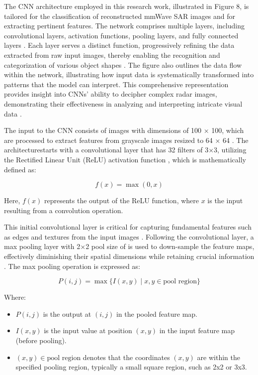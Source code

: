 \documentclass[journal,article,submit,pdftex,moreauthors]{Definitions/mdpi}
\begin{document}
The CNN architecture employed in this research work, illustrated in Figure 8, is tailored for the classification of reconstructed mmWave SAR images and for extracting pertinent features. The network comprises multiple layers, including convolutional layers, activation functions, pooling layers, and fully connected layers \cite{simonyan2014very}. Each layer serves a distinct function, progressively refining the data extracted from raw input images, thereby enabling the recognition and categorization of various object shapes \cite{zeiler2014visualizing}. The figure also outlines the data flow within the network, illustrating how input data is systematically transformed into patterns that the model can interpret. This comprehensive representation provides insight into CNNs' ability to decipher complex radar images, demonstrating their effectiveness in analyzing and interpreting intricate visual data \cite{goodfellow2016deep}.

The input to the CNN consists of images with dimensions of 100 × 100, which are processed to extract features from grayscale images resized to 64 × 64 \cite{he2016deep}. The architecturestarts with a convolutional layer that has 32 filters of 3×3, utilizing the Rectified Linear Unit (ReLU) activation function \cite{nair2010rectified}, which is mathematically defined as:

\begin{equation}
    f(x) = \max(0, x)
\end{equation}

Here, \(f(x)\) represents the output of the ReLU function, where \(x\) is the input resulting from a convolution operation.

This initial convolutional layer is critical for capturing fundamental features such as edges and textures from the input images \cite{szegedy2015going}. Following the convolutional layer, a max pooling layer with 2×2 pool size of  is used to down-sample the feature maps, effectively diminishing their spatial dimensions while retaining crucial information \cite{scherer2010evaluation}. The max pooling operation is expressed as:

\begin{equation}
    P(i, j) = \max\{I(x, y) \mid x, y \in \text{pool region}\}
\end{equation}

Where:

\begin{itemize}
  \item \(P(i, j)\) is the output at \((i, j)\) in the pooled feature map.
  \item \(I(x, y)\) is the input value at position \((x, y)\) in the input feature map (before pooling).
  \item \((x, y) \in \text{pool region}\) denotes that the coordinates \((x, y)\) are within the specified pooling region, typically a small square region, such as 2x2 or 3x3.
\end{itemize}
\end{document}

